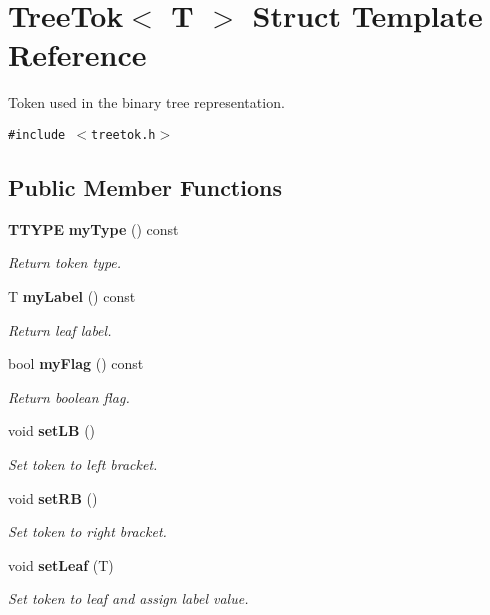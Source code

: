 \section{Tree\-Tok$<$ T $>$ Struct Template Reference}
\label{structTreeTok}
Token used in the binary tree representation.  


{\tt \#include $<$treetok.h$>$}

\subsection*{Public Member Functions}
\begin{CompactItemize}
\item 
{\bf TTYPE} {\bf my\-Type} () const 
\begin{CompactList}\small\item\em Return token type. \item\end{CompactList}\item 
T {\bf my\-Label} () const 
\begin{CompactList}\small\item\em Return leaf label. \item\end{CompactList}\item 
bool {\bf my\-Flag} () const 
\begin{CompactList}\small\item\em Return boolean flag. \item\end{CompactList}\item 
void {\bf set\-LB} ()
\begin{CompactList}\small\item\em Set token to left bracket. \item\end{CompactList}\item 
void {\bf set\-RB} ()
\begin{CompactList}\small\item\em Set token to right bracket. \item\end{CompactList}\item 
void {\bf set\-Leaf} (T)
\begin{CompactList}\small\item\em Set token to leaf and assign label value. \item\end{CompactList}\item 

\end{CompactItemize}
